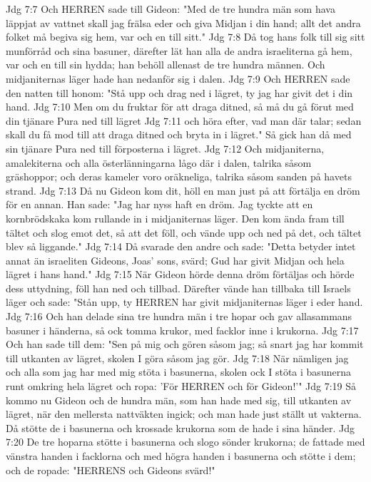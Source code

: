 Jdg 7:7  Och HERREN sade till Gideon: "Med de tre hundra män som hava läppjat av vattnet skall jag frälsa eder och giva Midjan i din hand; allt det andra folket må begiva sig hem, var och en till sitt."
Jdg 7:8  Då tog hans folk till sig sitt munförråd och sina basuner, därefter lät han alla de andra israeliterna gå hem, var och en till sin hydda; han behöll allenast de tre hundra männen. Och midjaniternas läger hade han nedanför sig i dalen.
Jdg 7:9  Och HERREN sade den natten till honom: "Stå upp och drag ned i lägret, ty jag har givit det i din hand.
Jdg 7:10  Men om du fruktar för att draga ditned, så må du gå förut med din tjänare Pura ned till lägret
Jdg 7:11  och höra efter, vad man där talar; sedan skall du få mod till att draga ditned och bryta in i lägret." Så gick han då med sin tjänare Pura ned till förposterna i lägret.
Jdg 7:12  Och midjaniterna, amalekiterna och alla österlänningarna lågo där i dalen, talrika såsom gräshoppor; och deras kameler voro oräkneliga, talrika såsom sanden på havets strand.
Jdg 7:13  Då nu Gideon kom dit, höll en man just på att förtälja en dröm för en annan. Han sade: "Jag har nyss haft en dröm. Jag tyckte att en kornbrödskaka kom rullande in i midjaniternas läger. Den kom ända fram till tältet och slog emot det, så att det föll, och vände upp och ned på det, och tältet blev så liggande."
Jdg 7:14  Då svarade den andre och sade: "Detta betyder intet annat än israeliten Gideons, Joas' sons, svärd; Gud har givit Midjan och hela lägret i hans hand."
Jdg 7:15  När Gideon hörde denna dröm förtäljas och hörde dess uttydning, föll han ned och tillbad. Därefter vände han tillbaka till Israels läger och sade: "Stån upp, ty HERREN har givit midjaniternas läger i eder hand.
Jdg 7:16  Och han delade sina tre hundra män i tre hopar och gav allasammans basuner i händerna, så ock tomma krukor, med facklor inne i krukorna.
Jdg 7:17  Och han sade till dem: "Sen på mig och gören såsom jag; så snart jag har kommit till utkanten av lägret, skolen I göra såsom jag gör.
Jdg 7:18  När nämligen jag och alla som jag har med mig stöta i basunerna, skolen ock I stöta i basunerna runt omkring hela lägret och ropa: 'För HERREN och för Gideon!'"
Jdg 7:19  Så kommo nu Gideon och de hundra män, som han hade med sig, till utkanten av lägret, när den mellersta nattväkten ingick; och man hade just ställt ut vakterna. Då stötte de i basunerna och krossade krukorna som de hade i sina händer.
Jdg 7:20  De tre hoparna stötte i basunerna och slogo sönder krukorna; de fattade med vänstra handen i facklorna och med högra handen i basunerna och stötte i dem; och de ropade: "HERRENS och Gideons svärd!"
